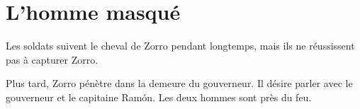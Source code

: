 \chapter{L'homme masqué}
Les soldats suivent le cheval de Zorro pendant longtemps, mais ils ne réussissent pas à capturer Zorro.

Plus tard, Zorro pénètre dans la demeure du gouverneur. Il désire parler avec le gouverneur et le capitaine Ramón. Les deux
hommes sont près du feu.
